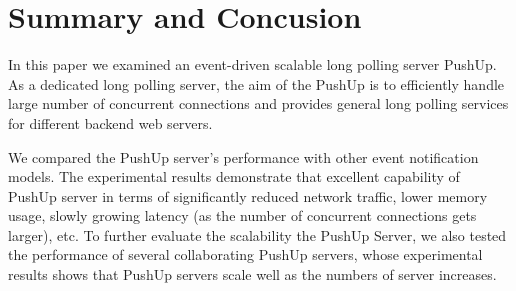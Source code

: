 \section{Summary and Concusion\\}

In this paper we examined an event-driven scalable long polling server PushUp.
As a dedicated long polling server, the aim of the PushUp is to efficiently
handle large number of concurrent connections and provides general long 
polling services for different backend web servers.

We compared the PushUp server's performance with other event notification 
models. The experimental results demonstrate that excellent capability of 
PushUp server in terms of significantly reduced network traffic, lower memory 
usage, slowly growing latency (as the number of concurrent connections gets 
larger), etc. To further evaluate the scalability the PushUp Server, we also
tested the performance of several collaborating PushUp servers, whose 
experimental results shows that PushUp servers scale well as the numbers of
server increases.

